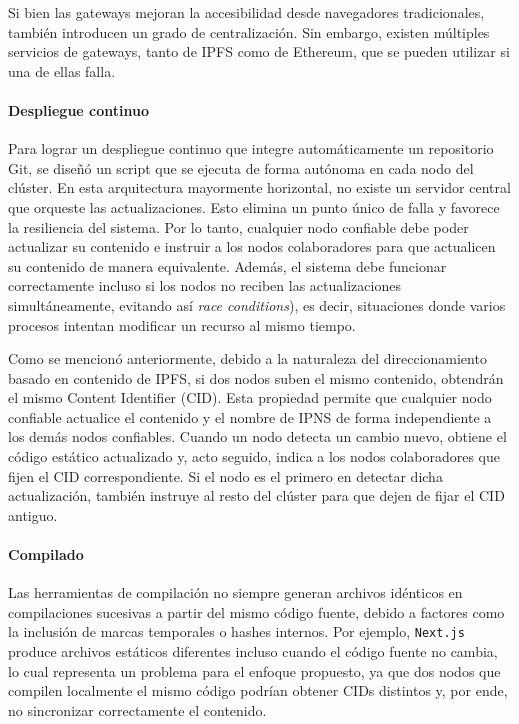 Si bien las gateways mejoran la accesibilidad desde navegadores tradicionales, también introducen un grado de centralización. Sin embargo, existen múltiples servicios de gateways, tanto de IPFS como de Ethereum, que se pueden utilizar si una de ellas falla.

\paragraph{Despliegue continuo}

Para lograr un despliegue continuo que integre automáticamente un repositorio Git, se diseñó un script que se ejecuta de forma autónoma en cada nodo del clúster. En esta arquitectura mayormente horizontal, no existe un servidor central que orqueste las actualizaciones. Esto elimina un punto único de falla y favorece la resiliencia del sistema. Por lo tanto, cualquier nodo confiable debe poder actualizar su contenido e instruir a los nodos colaboradores para que actualicen su contenido de manera equivalente. Además, el sistema debe funcionar correctamente incluso si los nodos no reciben las actualizaciones simultáneamente, evitando así \textit{race conditions}), es decir, situaciones donde varios procesos intentan modificar un recurso al mismo tiempo.

Como se mencionó anteriormente, debido a la naturaleza del direccionamiento basado en contenido de IPFS, si dos nodos suben el mismo contenido, obtendrán el mismo Content Identifier (CID). Esta propiedad permite que cualquier nodo confiable actualice el contenido y el nombre de IPNS de forma independiente a los demás nodos confiables. Cuando un nodo detecta un cambio nuevo, obtiene el código estático actualizado y, acto seguido, indica a los nodos colaboradores que fijen el CID correspondiente. Si el nodo es el primero en detectar dicha actualización, también instruye al resto del clúster para que dejen de fijar el CID antiguo.

\paragraph{Compilado} Las herramientas de compilación no siempre generan archivos idénticos en compilaciones sucesivas a partir del mismo código fuente, debido a factores como la inclusión de marcas temporales o hashes internos. Por ejemplo, \texttt{Next.js} produce archivos estáticos diferentes incluso cuando el código fuente no cambia, lo cual representa un problema para el enfoque propuesto, ya que dos nodos que compilen localmente el mismo código podrían obtener CIDs distintos y, por ende, no sincronizar correctamente el contenido.


